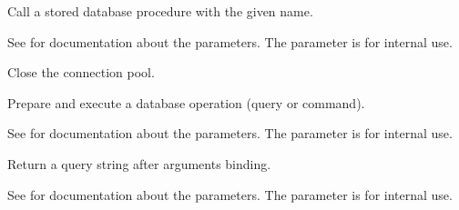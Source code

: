 \documentclass[letterpaper,10pt,english]{sphinxmanual}
\begin{document}
\begin{fulllineitems}
\begin{fulllineitems}
\label{api:momoko.Pool.callproc}
Call a stored database procedure with the given name.

See {\hyperref[api:momoko.Connection.callproc]{}} for documentation about the
parameters. The  parameter is for internal use.

\end{fulllineitems}


\begin{fulllineitems}
\label{api:momoko.Pool.close}
Close the connection pool.

\end{fulllineitems}


\begin{fulllineitems}
\label{api:momoko.Pool.execute}
Prepare and execute a database operation (query or command).

See {\hyperref[api:momoko.Connection.execute]{}} for documentation about the
parameters. The  parameter is for internal use.

\end{fulllineitems}


\begin{fulllineitems}
\label{api:momoko.Pool.mogrify}
Return a query string after arguments binding.

See {\hyperref[api:momoko.Connection.mogrify]{}} for documentation about the
parameters. The  parameter is for internal use.

\end{fulllineitems}



\end{fulllineitems}
\end{document}
